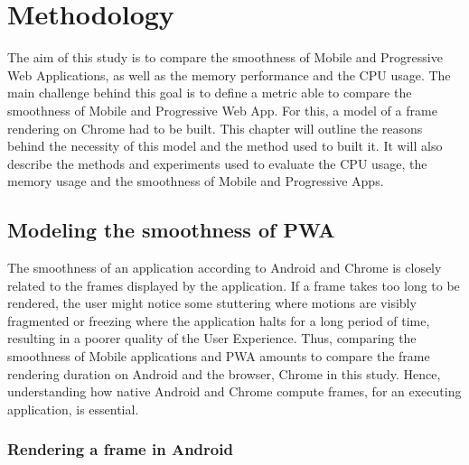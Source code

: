 \iffalse
\chapter{Methodology}


The aim of this study is to compare the smoothness of Mobile and Progressive Web Applications, as well as the memory performance and the CPU usage. The main challenge behind this goal is to define a metric able to compare the smoothness of Mobile and Progressive Web App. For this, a model of a frame rendering on Chrome had to be built. This chapter will outline the reasons behind the necessity of this model and the method used to built it. It will also describe the methods and experiments used to evaluate the CPU usage, the memory usage and the smoothness of Mobile and Progressive Apps.


\section{Modeling the smoothness of PWA}
\label{method:smoothness}
    
    The smoothness of an application according to Android and Chrome is closely related to the frames displayed by the application\citationneeded. If a frame takes too long to be rendered, the user might notice some stuttering where motions are visibly fragmented or freezing where the application halts for a long period of time, resulting in a poorer quality of the User Experience. Thus, comparing the smoothness of Mobile applications and PWA amounts to compare the frame rendering duration on Android and the browser, Chrome in this study. Hence, understanding how native Android and Chrome compute frames, for an executing application, is essential. 
    
    \subsection{Rendering a frame in Android}
    
